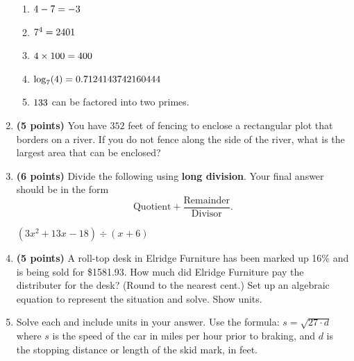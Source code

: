 \documentclass[12pt]{amsart}
\begin{document}
\begin{enumerate}
\begin{enumerate}
\item $4 - 7 = -3$
\item $7^{4} = 2401$
\item $4 \times 100 = 400$
\item $\log_{7}(4) = 0.7124143742160444$
\item $133$ can be factored into two primes.
\end{enumerate} 
\vfill 
\newpage\def \x{88}\def \y{176}\def \L{352}\def \area{15488}
\item {\bf (5 points)} 
 You have $\L$ feet of fencing to enclose a rectangular plot that borders on a river. If you do not fence along the side of the river, what is the largest area that can be enclosed? \\

  
\vfill \vfill \vfill
\def \a{6}\def \b{3}\def \c{-5}\def \r{12}\def \monicpol{x^{}+6}\def \longnbad{3x^{2}+13x^{}-18}\def \anspol{3x^{}-5}
\item {\bf (6 points)} 
 Divide the following using {\bf long division}. Your final answer should be in the form $$ \text{Quotient} + \dfrac{\text{Remainder}}{\text{Divisor}}.$$

\vspace{3mm}

$(\longnbad) \div (\monicpol)$

\vfill  \vfill \vfill
\newpage\def \discount{16}\def \paid{1581.93}\def \rainy{11.89}\def \orcost{1883.25}\def \purcost{1363.73}\def \orrainy{14.15}
\item {\bf (5 points)} 
 A roll-top desk in Elridge Furniture has been marked up \discount\% and is being sold for \$\paid. How much did Elridge Furniture pay the distributer for the desk? (Round to the nearest cent.) Set up an algebraic equation to represent the situation and solve. Show units.

\vfill 
\def \insvar{27}\def \d{60}\def \zerospeed{40.25}\def \slimit{45}\def \s{57}\def \skidd{120.333}\def \safed{75.0}\def \rsafed{75}

 
\item Solve each and include units in your answer. Use the formula: $s = \sqrt{\insvar \cdot d}$ where $s$ is the speed of the car in miles per hour prior to braking, and $d$ is the stopping distance or length of the skid mark, in feet. 


\end{enumerate}
\end{document}
